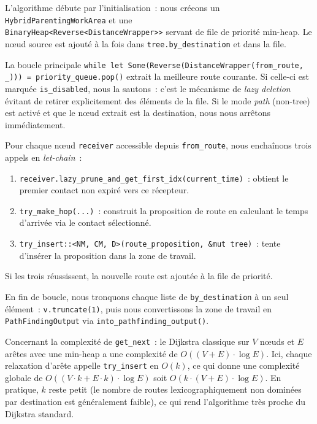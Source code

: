 \documentclass{article}
\begin{document}
L'algorithme débute par l'initialisation~: nous créeons un \texttt{HybridParentingWorkArea} et une
\\ \texttt{BinaryHeap<Reverse<DistanceWrapper>>} servant de file de priorité min-heap.
Le nœud source est ajouté à la fois dans \texttt{tree.by\_destination} et dans la file.

La boucle principale \texttt{while let Some(Reverse(DistanceWrapper(from_route, _))) = priority_queue.pop()}
extrait la meilleure route courante. Si celle-ci est marquée \texttt{is_disabled}, nous la
sautons~: c'est le mécanisme de \textit{lazy deletion} évitant de retirer explicitement des éléments
de la file. Si le mode \textit{path} (non-tree) est activé et que le nœud extrait est la destination,
nous nous arrêtons immédiatement.

Pour chaque nœud \texttt{receiver} accessible depuis \texttt{from\_route}, nous enchaînons trois
appels en \textit{let-chain}~:
\begin{enumerate}
    \item \texttt{receiver.lazy_prune_and_get_first_idx(current_time)}~: obtient le premier
    contact non expiré vers ce récepteur.
    \item \texttt{try_make_hop(...)}~: construit la proposition de route en calculant le
    temps d'arrivée via le contact sélectionné.
    \item \texttt{try_insert::<NM, CM, D>(route_proposition, &mut tree)}~: tente d'insérer
    la proposition dans la zone de travail.
\end{enumerate}
Si les trois réussissent, la nouvelle route est ajoutée à la file de priorité.

En fin de boucle, nous tronquons chaque liste de \texttt{by\_destination} à un seul élément~:
\texttt{v.truncate(1)}, puis nous convertissons la zone de travail en \texttt{PathFindingOutput}
via \texttt{into\_pathfinding\_output()}.

Concernant la complexité de \texttt{get\_next}~: le Dijkstra classique sur $V$ nœuds et $E$ arêtes
avec une min-heap a une complexité de $O((V + E) \cdot \log E)$. Ici, chaque relaxation
d'arête appelle \texttt{try\_insert} en $O(k)$, ce qui donne une complexité globale de
$O((V \cdot k + E \cdot k) \cdot \log E)$ soit $O(k \cdot (V + E) \cdot \log E)$.
En pratique, $k$ reste petit (le nombre de routes lexicographiquement non dominées par destination
est généralement faible), ce qui rend l'algorithme très proche du Dijkstra standard.
\end{document}
